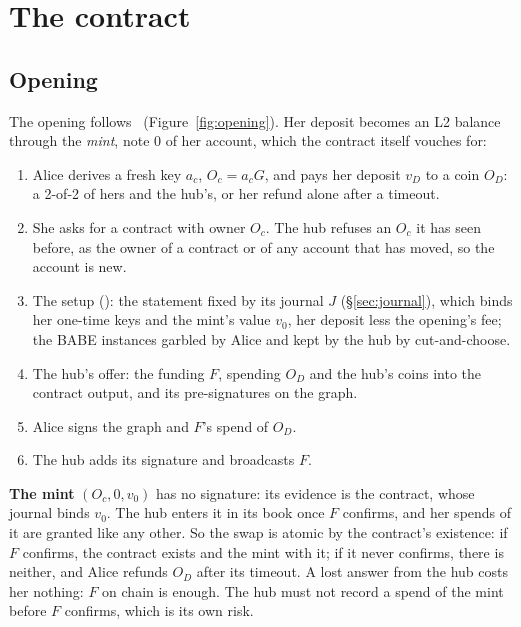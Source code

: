 \documentclass[11pt]{article}
\theoremstyle{plain}
\theoremstyle{definition}
\newcommand{\Oc}{O_c}
\begin{document}
\section{The contract}\label{sec:contract}

\subsection{Opening}\label{sec:opening}

The opening follows~\cite{lichen} (Figure~\ref{fig:opening}). Her
deposit becomes an L2 balance through the \emph{mint}, note 0 of her
account, which the contract itself vouches for:
\begin{enumerate}[nosep]
\item Alice derives a fresh key $a_c$, $\Oc = a_cG$, and pays her
  deposit $v_D$ to a coin $O_D$: a 2-of-2 of hers and the hub's, or her
  refund alone after a timeout.
\item She asks for a contract with owner $\Oc$. The hub refuses an $\Oc$
  it has seen before, as the owner of a contract or of any account that
  has moved, so the account is new.
\item The setup (\cite{lichen}): the statement fixed by its journal $J$
  (\S\ref{sec:journal}), which binds her one-time keys and the mint's
  value $v_0$, her deposit less the opening's fee; the BABE instances
  garbled by Alice and kept by the hub by cut-and-choose.
\item The hub's offer: the funding $F$, spending $O_D$ and the hub's
  coins into the contract output, and its pre-signatures on the graph.
\item Alice signs the graph and $F$'s spend of $O_D$.
\item The hub adds its signature and broadcasts $F$.
\end{enumerate}
\textbf{The mint} $(\Oc, 0, v_0)$ has no signature: its evidence is the
contract, whose journal binds $v_0$. The hub enters it in its book once
$F$ confirms, and her spends of it are granted like any other. So the
swap is atomic by the contract's existence: if $F$ confirms, the
contract exists and the mint with it; if it never confirms, there is
neither, and Alice refunds $O_D$ after its timeout. A lost answer from
the hub costs her nothing: $F$ on chain is enough. The hub must not
record a spend of the mint before $F$ confirms, which is its own risk.
\end{document}
